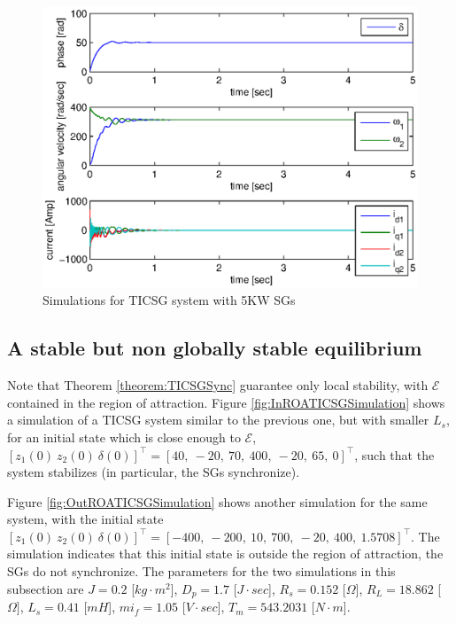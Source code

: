 \documentclass[letterpaper, 10 pt, conference]{ieeeconf}
\newcommand{\m}      {{\hbox{\hskip 1pt}}}
\newcommand{\Emscr}  {{\mathcal{E}}}
\begin{document}
\vspace{-4mm}
\begin{figure}[ht] 
\includegraphics[scale=0.65]{5KWTICSGSimulation} \vspace{-8mm}
\caption{Simulations for TICSG system with 5KW SGs} 
\label{fig:5KWSGTICSGSimulation}
\end{figure}

\subsection{A stable but non globally stable equilibrium}

Note that Theorem \ref{theorem:TICSGSync} guarantee only local
stability, with $\Emscr$ contained in the region of attraction. 
Figure \ref{fig:InROATICSGSimulation} shows a simulation of a TICSG 
system similar to the previous one, but with smaller $L_s$, for an
initial state which is close enough to $\Emscr$, $\left[z_1(0)\ z_2(0)
\ \delta(0)\right]^\top=\left[40,\ -20,\ 70,\ 400,\ -20,\ 65,\ 0
\right]^\top$, such that the system stabilizes (in particular, the SGs
synchronize). 

Figure \ref{fig:OutROATICSGSimulation} shows another simulation for
the same system, with the initial state $\left[z_1(0)\ z_2(0) \
\delta(0) \right]^\top=\left[-400,\ -200,\ 10,\ 700,\ -20,\ 400,\
1.5708\right]^\top$. \m The simu\-lation indicates that this initial
state is outside the region of attraction, the SGs do not
synchronize. The parameters for the two simulations in this subsection
are $J=0.2$ {[}$kg\cdot m^{2}${]}, $D_{p}=1.7$ {[}$J\cdot sec${]}, $R_{s}=0.152$
{[}$\Omega]$, $R_{L}=18.862$ {[}$\Omega]$, $L_{s}=0.41$ {[}$mH${]},
$mi_{f}=1.05$ {[}$V\cdot sec]$, $T_{m}=543.2031$ {[}$N\cdot m${]}.
\end{document}
